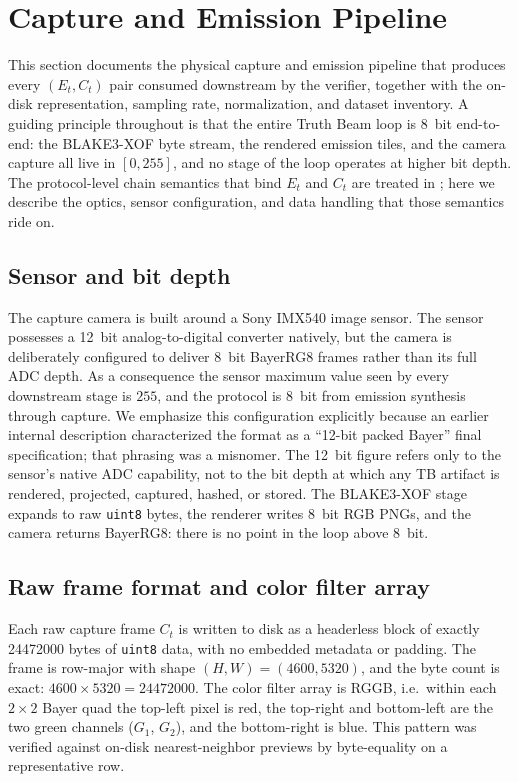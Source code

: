 \section{Capture and Emission Pipeline}
\label{sec:hardware}

This section documents the physical capture and emission pipeline that produces every $(E_t, C_t)$ pair consumed downstream by the verifier, together with the on-disk representation, sampling rate, normalization, and dataset inventory. A guiding principle throughout is that the entire Truth Beam loop is \SI{8}{bit} end-to-end: the BLAKE3-XOF byte stream, the rendered emission tiles, and the camera capture all live in $[0,255]$, and no stage of the loop operates at higher bit depth. The protocol-level chain semantics that bind $E_t$ and $C_t$ are treated in ; here we describe the optics, sensor configuration, and data handling that those semantics ride on.

\subsection{Sensor and bit depth}
\label{sec:hardware:sensor}

The capture camera is built around a Sony IMX540 image sensor. The sensor possesses a \SI{12}{bit} analog-to-digital converter natively, but the camera is deliberately configured to deliver \SI{8}{bit} BayerRG8 frames rather than its full ADC depth. As a consequence the sensor maximum value seen by every downstream stage is $255$, and the protocol is \SI{8}{bit} from emission synthesis through capture. We emphasize this configuration explicitly because an earlier internal description characterized the format as a ``12-bit packed Bayer'' final specification; that phrasing was a misnomer. The \SI{12}{bit} figure refers only to the sensor's native ADC capability, not to the bit depth at which any TB artifact is rendered, projected, captured, hashed, or stored. The BLAKE3-XOF stage \cite{blake3} expands to raw \texttt{uint8} bytes, the renderer writes \SI{8}{bit} RGB PNGs, and the camera returns BayerRG8: there is no point in the loop above \SI{8}{bit}.

\subsection{Raw frame format and color filter array}
\label{sec:hardware:raw}

Each raw capture frame $C_t$ is written to disk as a headerless block of exactly \num{24472000} bytes of \texttt{uint8} data, with no embedded metadata or padding. The frame is row-major with shape $(H, W) = (4600, 5320)$, and the byte count is exact: $4600 \times 5320 = \num{24472000}$. The color filter array is RGGB, i.e.\ within each $2\times2$ Bayer quad the top-left pixel is red, the top-right and bottom-left are the two green channels ($G_1$, $G_2$), and the bottom-right is blue. This pattern was verified against on-disk nearest-neighbor previews by byte-equality on a representative row.

